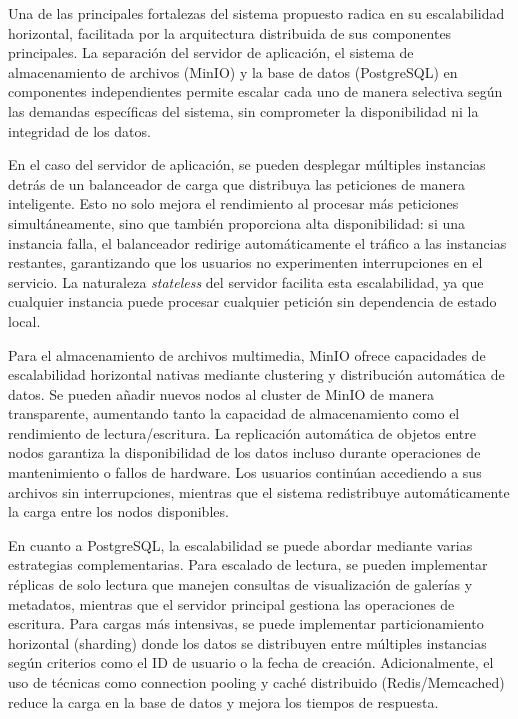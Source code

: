Una de las principales fortalezas del sistema propuesto radica en su escalabilidad horizontal, facilitada por la arquitectura distribuida de sus componentes principales. La separación del servidor de aplicación, el sistema de almacenamiento de archivos (MinIO) y la base de datos (PostgreSQL) en componentes independientes permite escalar cada uno de manera selectiva según las demandas específicas del sistema, sin comprometer la disponibilidad ni la integridad de los datos.

En el caso del servidor de aplicación, se pueden desplegar múltiples instancias detrás de un balanceador de carga que distribuya las peticiones de manera inteligente. Esto no solo mejora el rendimiento al procesar más peticiones simultáneamente, sino que también proporciona alta disponibilidad: si una instancia falla, el balanceador redirige automáticamente el tráfico a las instancias restantes, garantizando que los usuarios no experimenten interrupciones en el servicio. La naturaleza \textit{stateless} del servidor facilita esta escalabilidad, ya que cualquier instancia puede procesar cualquier petición sin dependencia de estado local.

Para el almacenamiento de archivos multimedia, MinIO ofrece capacidades de escalabilidad horizontal nativas mediante clustering y distribución automática de datos. Se pueden añadir nuevos nodos al cluster de MinIO de manera transparente, aumentando tanto la capacidad de almacenamiento como el rendimiento de lectura/escritura. La replicación automática de objetos entre nodos garantiza la disponibilidad de los datos incluso durante operaciones de mantenimiento o fallos de hardware. Los usuarios continúan accediendo a sus archivos sin interrupciones, mientras que el sistema redistribuye automáticamente la carga entre los nodos disponibles.

En cuanto a PostgreSQL, la escalabilidad se puede abordar mediante varias estrategias complementarias. Para escalado de lectura, se pueden implementar réplicas de solo lectura que manejen consultas de visualización de galerías y metadatos, mientras que el servidor principal gestiona las operaciones de escritura. Para cargas más intensivas, se puede implementar particionamiento horizontal (sharding) donde los datos se distribuyen entre múltiples instancias según criterios como el ID de usuario o la fecha de creación. Adicionalmente, el uso de técnicas como connection pooling y caché distribuido (Redis/Memcached) reduce la carga en la base de datos y mejora los tiempos de respuesta.

